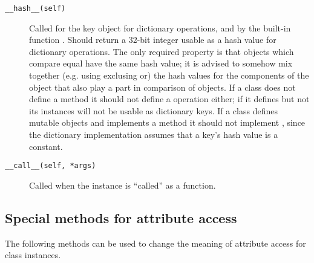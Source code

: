 \begin{description}
\item[\tt __hash__(self)]
Called for the key object for dictionary operations,
and by the built-in function
.  Should return a 32-bit integer usable as a hash value
for dictionary operations.  The only required property is that objects
which compare equal have the same hash value; it is advised to somehow
mix together (e.g. using exclusing or) the hash values for the
components of the object that also play a part in comparison of
objects.  If a class does not define a  method it should
not define a  operation either; if it defines
 but not  its instances will not be
usable as dictionary keys.  If a class defines mutable objects and
implements a  method it should not implement
, since the dictionary implementation assumes that a
key's hash value is a constant.

\item[\tt __call__(self, *args)]
Called when the instance is ``called'' as a function.

\end{description}


\subsection{Special methods for attribute access}

The following methods can be used to change the meaning of attribute
access for class instances.

